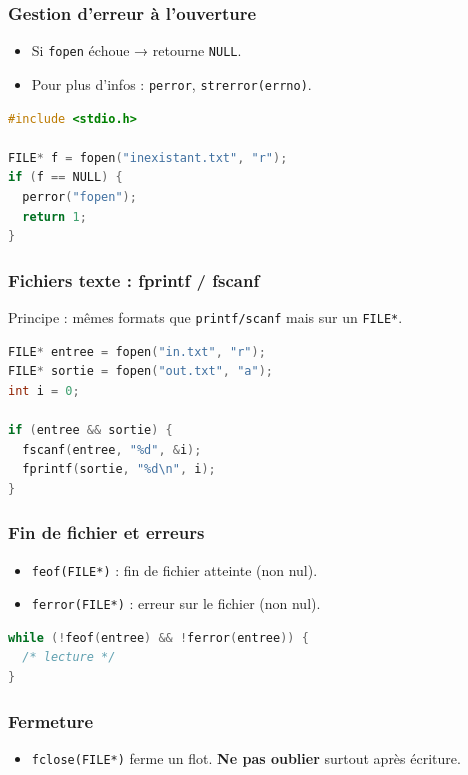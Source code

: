 \subsubsection{Gestion d’erreur à l’ouverture}
\begin{itemize}
  \item Si \texttt{fopen} échoue → retourne \texttt{NULL}.
  \item Pour plus d’infos : \texttt{perror}, \texttt{strerror(errno)}.
\end{itemize}

\begin{lstlisting}[language=C]
#include <stdio.h>

FILE* f = fopen("inexistant.txt", "r");
if (f == NULL) {
  perror("fopen");
  return 1;
}
\end{lstlisting}

\subsubsection{Fichiers texte : fprintf / fscanf}
Principe : mêmes formats que \texttt{printf/scanf} mais sur un \texttt{FILE*}.

\begin{lstlisting}[language=C]
FILE* entree = fopen("in.txt", "r");
FILE* sortie = fopen("out.txt", "a");
int i = 0;

if (entree && sortie) {
  fscanf(entree, "%d", &i);
  fprintf(sortie, "%d\n", i);
}
\end{lstlisting}

\subsubsection{Fin de fichier et erreurs}
\begin{itemize}
  \item \texttt{feof(FILE*)} : fin de fichier atteinte (non nul).
  \item \texttt{ferror(FILE*)} : erreur sur le fichier (non nul).
\end{itemize}

\begin{lstlisting}[language=C]
while (!feof(entree) && !ferror(entree)) {
  /* lecture */
}
\end{lstlisting}

\subsubsection{Fermeture}
\begin{itemize}
  \item \texttt{fclose(FILE*)} ferme un flot. \textbf{Ne pas oublier} surtout après écriture. 
\end{itemize}

